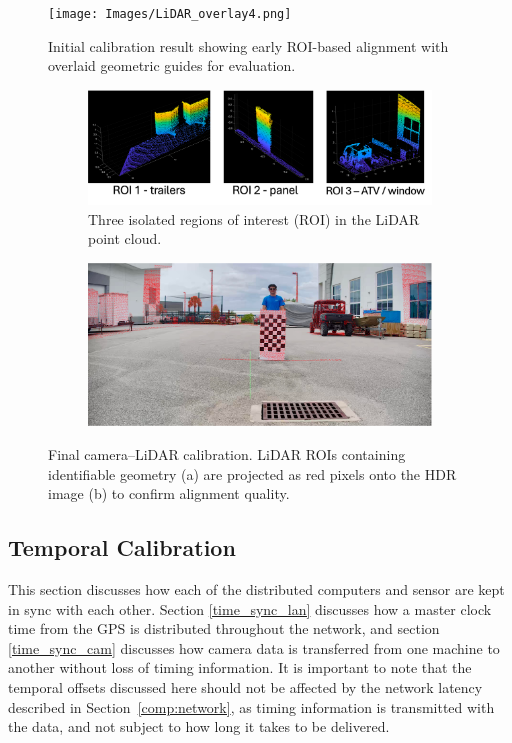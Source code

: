 \documentclass[../main.tex]{subfiles}
\begin{document}
\begin{figure}[ht]
    \centering
    \texttt{[image: Images/LiDAR\_overlay4.png]}
    \caption{Initial calibration result showing early ROI-based alignment with overlaid geometric guides for evaluation.}
    \label{fig:LiDAR_overlay4}
\end{figure}
\begin{figure}[htp]
\begin{subfigure}{\textwidth}
\centering
\includegraphics[width=0.94\linewidth]{Images/LiDAR_overlay3A.png}
    \caption{Three isolated regions of interest (ROI) in the LiDAR point cloud.}
    \label{fig:LiDAR_overlay3A}
\end{subfigure}
\bigskip
\begin{subfigure}{\textwidth}
\centering
\includegraphics[width=0.94\linewidth]{Images/LiDAR_overlay3B.png}
    \caption{}
    \label{fig:LiDAR_overlay3B.png}
\end{subfigure}
\caption{Final camera–LiDAR calibration. LiDAR ROIs containing identifiable geometry (a) are projected as red pixels onto the HDR image (b) to confirm alignment quality.}
\label{HDR_calib_final}
\end{figure}
\subsection{Temporal Calibration}
\label{time_sync}

This section discusses how each of the distributed computers and sensor are kept in sync with each other.
Section \ref{time_sync_lan} discusses how a master clock time from the GPS is distributed throughout the network, and section \ref{time_sync_cam} discusses how camera data is transferred from one machine to another without loss of timing information.
It is important to note that the temporal offsets discussed here should not be affected by the network latency described in Section~\ref{comp:network}, as timing information is transmitted with the data, and not subject to how long it takes to be delivered. 
\end{document}
